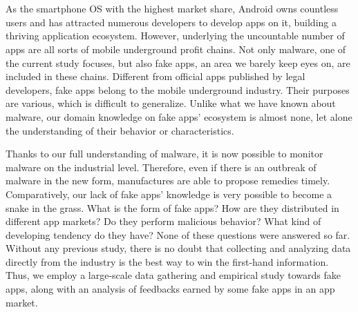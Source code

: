 \newpage


\chapter*{}
\vspace{-5mm}

As the smartphone OS with the highest market share, Android owns countless users and has attracted numerous developers to develop apps on it, building a thriving application ecosystem.
However, underlying the uncountable number of apps are all sorts of mobile underground profit chains.
Not only malware, one of the current study focuses, but also fake apps, an area we barely keep eyes on, are included in these chains.
Different from official apps published by legal developers, fake apps belong to the mobile underground industry.
Their purposes are various, which is difficult to generalize.
Unlike what we have known about malware, our domain knowledge on fake apps' ecosystem is almost none, let alone the understanding of their behavior or characteristics.

Thanks to our full understanding of malware, it is now possible to monitor malware on the industrial level.
Therefore, even if there is an outbreak of malware in the new form, manufactures are able to propose remedies timely.
Comparatively, our lack of fake apps' knowledge is very possible to become a snake in the grass.
What is the form of fake apps? How are they distributed in different app markets? Do they perform malicious behavior? What kind of developing tendency do they have?
None of these questions were answered so far.
Without any previous study, there is no doubt that collecting and analyzing data directly from the industry is the best way to win the first-hand information.
Thus, we employ a large-scale data gathering and empirical study towards fake apps, along with an analysis of feedbacks earned by some fake apps in an app market.

